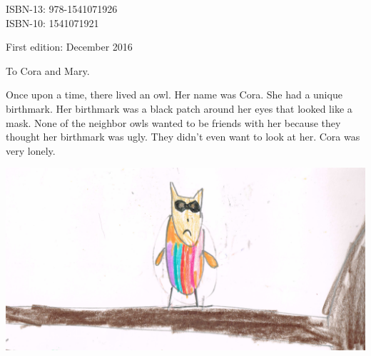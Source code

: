 \documentclass[12pt]{extbook}
\newcommand\blankpage{%
    \null
    \thispagestyle{empty}%
    \addtocounter{page}{-1}%
    \newpage}
\begin{document}


  ISBN-13: 978-1541071926\\
  ISBN-10: 1541071921 

  First edition: December 2016

  \vfill
  \vspace*{2\baselineskip}
  \clearpage
  \endgroup

  \begingroup
  \vspace*{\fill}
  \begin{center}
  To Cora and Mary.
  \end{center}
  \vspace*{\fill}
  \afterpage{\blankpage}
  \endgroup
  \setcounter{page}{0}
  \clearpage
  

  
  \pagestyle{fancy}

\LARGE

  Once upon a time, there lived an owl. Her name was Cora. She had a
  unique birthmark. Her birthmark was a black patch around her eyes that
  looked like a mask. None of the neighbor owls wanted to be friends with
  her because they thought her birthmark was ugly. They didn't even want
  to look at her. Cora was very lonely.

\begin{center}
  \includegraphics[width=\textwidth]{img/cm-pic01.png}
\end{center}
  
\pagebreak
  
\end{document}
